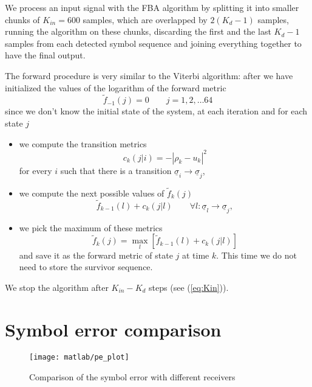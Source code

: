 \documentclass[a4paper,oneside]{article}
\renewcommand{\vec}[1]{\underline{#1}}
\newcommand{\abs}[1]{\left|#1\right|}
\newcommand{\vsigma}[0]{\vec{\sigma}}
\begin{document}
We process an input signal with the FBA algorithm by splitting it into
smaller chunks of $K_{in} = 600$ samples, which are overlapped by
$2(K_d-1)$ samples, running the algorithm on these chunks, discarding
the first and the last $K_d-1$ samples from each detected symbol
sequence and joining everything together to have the final output.

The forward procedure is very similar to the Viterbi algorithm: after
we have initialized the values of the logarithm of the forward metric
\begin{equation}
  \tilde{f}_{-1}(j) = 0 \qquad j=1,2,\dots 64
\end{equation}
since we don't know the initial state of the system, at each iteration
and for each state $j$
\begin{itemize}
  \item we compute the transition metrics
    \begin{equation}
      c_k(j|i) = -\abs{\rho_k - u_k}^2
    \end{equation}
    for every $i$ such that there is a transition $\vsigma_i
    \rightarrow \vsigma_j$,
  \item we compute the next possible values of $\tilde{f}_k(j)$
    \begin{equation}
      \tilde{f}_{k-1}(l) + c_k(j|l) \qquad \forall l : \vsigma_l \rightarrow \vsigma_j ,
    \end{equation}
  \item we pick the maximum of these metrics
    \begin{equation}
       \tilde{f}_{k}(j)  = \max_{l} \left[ \tilde{f}_{k-1}(l) + c_k(j|l) \right] 
    \end{equation}
    and save it as the forward metric of state $j$ at time $k$. This
    time we do not need to store the survivor sequence.
\end{itemize}
We stop the algorithm after $K_{in} - K_d$ steps (see (\ref{eq:Kin})).



\section{Symbol error comparison}
\begin{figure}[htbp]
  \centering
  \texttt{[image: matlab/pe\_plot]}
  \caption{Comparison of the symbol error with different receivers}
  \label{plot:pe_all}
\end{figure}
\end{document}
